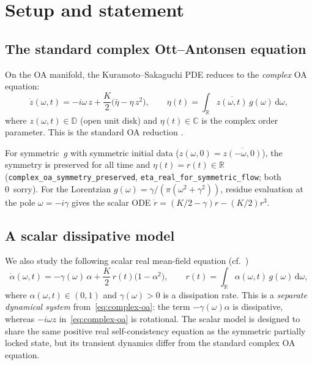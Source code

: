 \documentclass[11pt,a4paper]{article}
\theoremstyle{definition}
\newcommand{\D}{\mathbb{D}}
\newcommand{\R}{\mathbb{R}}
\newcommand{\C}{\mathbb{C}}
\begin{document}
\tableofcontents

\section{Setup and statement}

\subsection{The standard complex Ott--Antonsen equation}\label{sec:complex-oa}

On the OA manifold, the Kuramoto--Sakaguchi PDE reduces to the \emph{complex} OA equation:
\begin{equation}\label{eq:complex-oa}
\dot{z}(\omega,t) = -i\omega\,z + \frac{K}{2}\bigl(\bar\eta - \eta\,z^2\bigr), \qquad \eta(t) = \int_\R \overline{z(\omega,t)}\,g(\omega)\,\mathrm{d}\omega,
\end{equation}
where $z(\omega,t) \in \D$ (open unit disk) and $\eta(t) \in \C$ is the complex order parameter. This is the standard OA reduction \cite{ott-antonsen2008}.

For symmetric~$g$ with symmetric initial data ($z(\omega,0) = \overline{z(-\omega,0)}$), the symmetry is preserved for all time and $\eta(t) = r(t) \in \R$ (\texttt{complex\_oa\_symmetry\_preserved}, \texttt{eta\_real\_for\_symmetric\_flow}; both 0~sorry). For the Lorentzian $g(\omega) = \gamma/(\pi(\omega^2+\gamma^2))$, residue evaluation at the pole $\omega = -i\gamma$ gives the scalar ODE $\dot{r} = (K/2-\gamma)r - (K/2)r^3$.

\subsection{A scalar dissipative model}\label{sec:scalar-model}

We also study the following scalar real mean-field equation (cf.~\cite{strogatz2000,kuramoto1975})
\begin{equation}\label{eq:oa}
\dot{\alpha}(\omega,t) = -\gamma(\omega)\,\alpha + \frac{K}{2}\,r(t)\bigl(1 - \alpha^2\bigr), \qquad r(t) = \int_\R \alpha(\omega,t)\,g(\omega)\,\mathrm{d}\omega,
\end{equation}
where $\alpha(\omega,t) \in (0,1)$ and $\gamma(\omega) > 0$ is a dissipation rate. This is a \emph{separate dynamical system} from~\eqref{eq:complex-oa}: the term $-\gamma(\omega)\alpha$ is dissipative, whereas $-i\omega z$ in~\eqref{eq:complex-oa} is rotational. The scalar model is designed to share the same positive real self-consistency equation as the symmetric partially locked state, but its transient dynamics differ from the standard complex OA equation.
\end{document}
